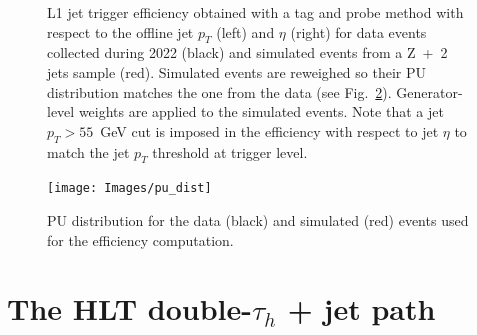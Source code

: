 \documentclass[../main.tex]{subfiles}
\begin{document}
\begin{figure}[h!]
\begin{center}
\end{center}
\caption[L1 jet trigger efficiency]{L1 jet trigger efficiency obtained with a tag and probe method with respect to the offline jet $p_T$ (left) and $\eta$ (right) for data events collected during 2022 (black) and simulated events from a Z~+~2 jets sample (red). Simulated events are reweighed so their PU distribution matches the one from the data (see Fig.~\ref{hh:fig:trig_pu_dist}). Generator-level weights are applied to the simulated events. Note that a jet $p_T>55$~GeV cut is imposed in the efficiency with respect to jet $\eta$ to match the jet $p_T$  threshold at trigger level.}
\label{hh:fig:l1_eff_jetleg}
\end{figure}


\begin{figure}[h!]
\begin{center}
\texttt{[image: Images/pu\_dist]}
\end{center}
\caption[PU distributions in 2022]{PU distribution for the data (black) and simulated (red) events used for the efficiency computation.}
\label{hh:fig:trig_pu_dist}
\end{figure}



\section{The HLT double-$\tau_h$ + jet path}
\label{hh:sec:hlt_doubletaujet}
\end{document}
